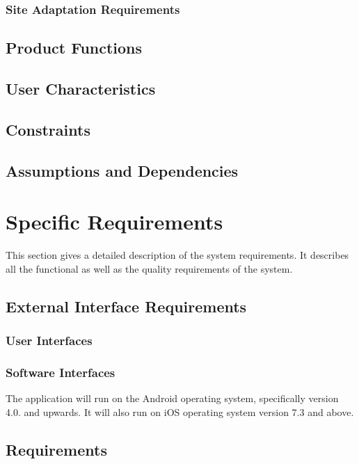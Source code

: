 \documentclass[a4paper,10pt]{article}
\begin{document}
		\subsubsection{Site Adaptation Requirements}
		
	\subsection{Product Functions}			
					
	\subsection{User Characteristics}

	\subsection{Constraints}

	\subsection{Assumptions and Dependencies}

		
	\section{Specific Requirements}
This section gives a detailed description of the system requirements. It describes all the functional as well as the quality requirements of the system.

	\subsection{External Interface Requirements}

                 \subsubsection{User Interfaces}

                 \subsubsection{Software Interfaces}
The application will run on the Android operating system, specifically version 4.0. and upwards. It will also run on iOS operating system version 7.3 and above.

	\subsection{Requirements}
\end{document}
